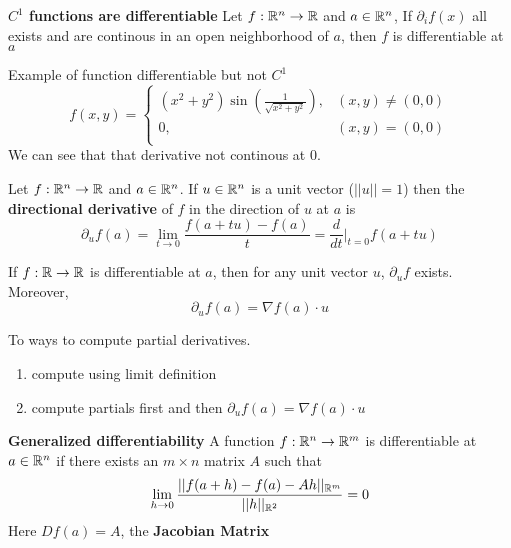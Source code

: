 \documentclass[11pt]{article}
\begin{document}
\begin{theorem}
  \label{C1 implies differentiability} \textbf{$C^1$ functions are differentiable}
  Let $f:\mathbb{R}^n\to\mathbb{R}$ and $a\in\mathbb{R}^n$, If $\partial_i f(x)$ all exists and are continous in an open neighborhood of $a$, then $f$ is differentiable at $a$
\end{theorem}


\begin{rem}
  Example of function differentiable but not $C^1$
  \[
    f(x,y) =
    \begin{cases}
      (x^2 + y^2)\sin(\frac{1}{\sqrt{x^2 + y^2}}), & (x,y)\neq (0,0)\\
      0,& (x,y) = (0,0)\\
    \end{cases}
  \]
  We can see that that derivative not continous at 0.\\
\end{rem}


\begin{defn}
  \label{directional derivatives}
  Let $f:\mathbb{R}^n \to \mathbb{R}$ and $a\in\mathbb{R}^n$. If $u\in\mathbb{R}^n$ is a unit vector ($||u||=1$) then the \textbf{directional derivative} of $f$ in the direction of $u$ at $a$ is
  \[
    \partial_u f(a) = \lim_{t\to0} \frac{f(a + tu) - f(a)}{t} = \frac{d}{dt} \vert_{t=0} f(a+tu)
  \]
\end{defn}

\begin{theorem}
  If $f:\mathbb{R} \to\mathbb{R}$ is differentiable at $a$, then for any unit vector $u$, $\partial_u f$ exists. Moreover,
  \[
    \partial_u f(a) = \nabla f(a) \cdot u
  \]
\end{theorem}

\begin{rem}
  To ways to compute partial derivatives.
  \begin{enumerate}
    \item compute using limit definition
    \item compute partials first and then $\partial_u f(a) = \nabla f(a) \cdot u$
  \end{enumerate}
\end{rem}

\begin{defn}
  \label{generalized differentiability}
  \textbf{Generalized differentiability} A function $f: \mathbb{R}^n \to \mathbb{R}^m$ is differentiable at $a\in \mathbb{R}^n$ if there exists an $m\times n$ matrix $A$ such that
  \[
    \lim_{h\to 0} \frac{|| f(a+h) - f(a) - Ah ||_{\mathbb{R}^m}}{||h||_{\mathbb{R}^2}} = 0
  \]
  Here $Df(a) = A$, the \textbf{Jacobian Matrix}
\end{defn}
\end{document}
